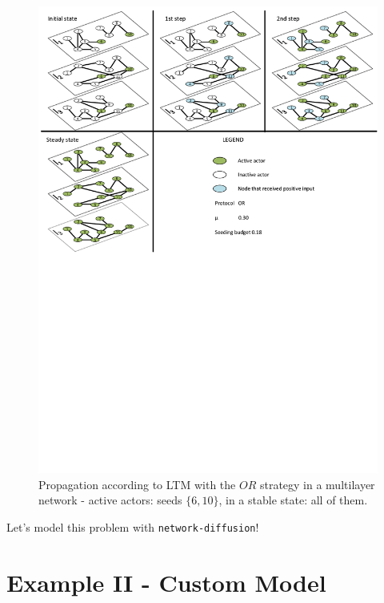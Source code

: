 \documentclass{beamer}
\begin{document}
\begin{frame}{\secname}
    \begin{figure}
        \centering
        \includegraphics[width=.75\textwidth]{figures/ltm_example_or.pdf}
        \caption{Propagation according to LTM with the $OR$ strategy in a multilayer network -
        active actors: seeds $\{6, 10\}$, in a stable state: all of them.}
    \end{figure}
\end{frame}

\begin{frame}{\secname}
    \begin{center}
        \large Let's model this problem with \lstinline[style=py]{network-diffusion}!
    \end{center}
\end{frame}

\section{Example II - Custom Model}
\end{document}
